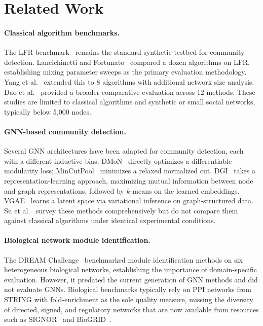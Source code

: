 \documentclass[11pt]{article}
\begin{document}
\section{Related Work}
\label{sec:related}

\paragraph{Classical algorithm benchmarks.}
The LFR benchmark~\citep{andrea_lancichinetti_125b2a5e} remains the standard synthetic testbed for community detection.
Lancichinetti and Fortunato~\citep{andrea_lancichinetti_37f463ca} compared a dozen algorithms on LFR, establishing mixing parameter sweeps as the primary evaluation methodology.
Yang et al.~\citep{zhao_yang_133f261c} extended this to 8 algorithms with additional network size analysis.
Dao et al.~\citep{vinh_loc_dao_5627549f} provided a broader comparative evaluation across 12 methods.
These studies are limited to classical algorithms and synthetic or small social networks, typically below 5{,}000 nodes.

\paragraph{GNN-based community detection.}
Several GNN architectures have been adapted for community detection, each with a different inductive bias.
DMoN~\citep{tsitsulin_dmon_2023} directly optimizes a differentiable modularity loss; MinCutPool~\citep{bianchi_mincut_2020} minimizes a relaxed normalized cut.
DGI~\citep{velickovic_dgi_2019} takes a representation-learning approach, maximizing mutual information between node and graph representations, followed by $k$-means on the learned embeddings.
VGAE~\citep{thomas_kipf_6638cd97} learns a latent space via variational inference on graph-structured data.
Su et al.~\citep{xing_su_d49e541e} survey these methods comprehensively but do not compare them against classical algorithms under identical experimental conditions.

\paragraph{Biological network module identification.}
The DREAM Challenge~\citep{choobdar_dream_2019} benchmarked module identification methods on six heterogeneous biological networks, establishing the importance of domain-specific evaluation.
However, it predated the current generation of GNN methods and did not evaluate GNNs.
Biological benchmarks typically rely on PPI networks from STRING with fold-enrichment as the sole quality measure, missing the diversity of directed, signed, and regulatory networks that are now available from resources such as SIGNOR~\citep{signor_2020} and BioGRID~\citep{biogrid_2023}.
\end{document}
